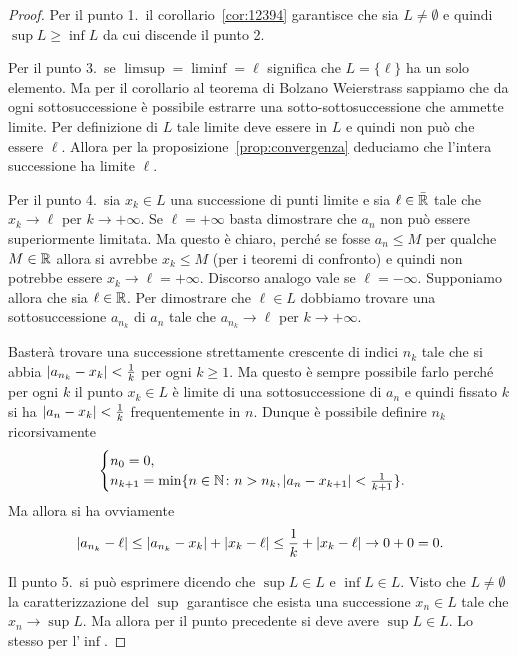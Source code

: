 \begin{proof}
  Per il punto 1.\
  il corollario~\ref{cor:12394} garantisce che sia $L\neq \emptyset$ e
  quindi $\sup L \ge \inf L$ da cui discende il punto 2.

  Per il punto 3.\ se $\limsup = \liminf = \ell$ significa che $L=\{\ell\}$
  ha un solo elemento. Ma per il corollario al teorema di Bolzano Weierstrass
  sappiamo che da ogni sottosuccessione è possibile estrarre una sotto-sottosuccessione
  che ammette limite. Per definizione di $L$ tale limite deve essere in $L$
  e quindi non può che essere $\ell$. Allora per la proposizione~\ref{prop:convergenza}
  deduciamo che l'intera successione ha limite $\ell$.

  Per il punto 4.\ sia $x_k\in L$ una successione di punti limite
  e sia $\ell\in \bar {\mathbb R}$ tale che $x_k \to \ell$ per $k\to +\infty$.
  Se $\ell = +\infty$ basta dimostrare che $a_n$ non può essere superiormente
  limitata. Ma questo è chiaro, perché se fosse $a_n \le M$ per qualche $M\in \mathbb R$
  allora si avrebbe $x_k\le M$ (per i teoremi di confronto) e quindi non potrebbe
  essere $x_k \to \ell=+\infty$. Discorso analogo vale se $\ell = -\infty$.
  Supponiamo allora che sia $\ell \in \mathbb R$.
  Per dimostrare che
  $\ell \in L$ dobbiamo trovare una sottosuccessione $a_{n_k}$ di $a_n$ tale
  che $a_{n_k}\to \ell$ per $k\to +\infty$.

  Basterà trovare una successione strettamente crescente
  di indici $n_k$ tale
  che si abbia ${\left|a_{n_k} - x_k\right|}<\frac 1 {k}$ per ogni
  $k\ge 1$.
  Ma questo è sempre possibile farlo perché per ogni $k$
  il punto $x_k\in L$ è limite di una sottosuccessione di
  $a_n$ e quindi fissato $k$ si ha ${\left|a_n-x_k\right|}<\frac 1 k$
  frequentemente in $n$.
  Dunque è possibile definire $n_k$ ricorsivamente
  \[
   \begin{cases}
    n_0 = 0,\\
    n_{k+1} = \min\{n\in \mathbb N \colon n>n_k, {\left|a_n-x_{k+1}\right|}<\frac{1}{k+1}\}.
   \end{cases}
  \]
  Ma allora si ha ovviamente
  \[
    {\left|a_{n_k} - \ell\right|}
    \le {\left|a_{n_k} - x_k\right|} + {\left|x_k -\ell\right|}
    \le \frac 1 k + {\left|x_k-\ell\right|} \to 0+0 = 0.
  \]

  Il punto 5.\ si può esprimere dicendo che $\sup L\in L$ e $\inf L \in L$.
  Visto che $L\neq \emptyset$ la caratterizzazione del $\sup$
  garantisce che esista una successione $x_n\in L$ tale che $x_n \to \sup L$.
  Ma allora per il punto precedente si deve avere $\sup L \in L$.
  Lo stesso per l'$\inf$.


\end{proof}
